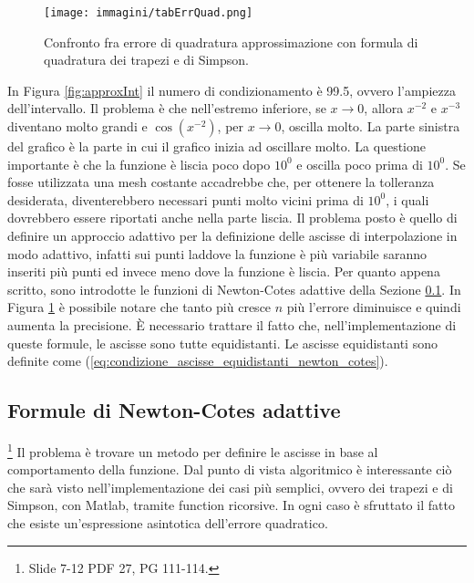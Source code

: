\begin{figure}
    \centering
    \texttt{[image: immagini/tabErrQuad.png]}
    \caption{Confronto fra errore di quadratura approssimazione con formula di quadratura dei trapezi e di Simpson.}\label{fig:tabella_errore_quadratura}
\end{figure}

In Figura \ref{fig:approxInt} il numero di condizionamento è 99.5, ovvero l'ampiezza dell'intervallo. Il problema è che nell'estremo inferiore, se $x\rightarrow 0$, allora $x^{-2}$ e $x^{-3}$ diventano molto grandi e $\cos{(x^{-2})}$, per $x\rightarrow 0$, oscilla molto. La parte sinistra del grafico è la parte in cui il grafico inizia ad oscillare molto. La questione importante è che la funzione è liscia poco dopo $10^0$ e oscilla poco prima di $10^0$. Se fosse utilizzata una mesh costante accadrebbe che, per ottenere la tolleranza desiderata, diventerebbero necessari punti molto vicini prima di $10^0$, i quali dovrebbero essere riportati anche nella parte liscia. Il problema posto è quello di definire un approccio adattivo per la definizione delle ascisse di interpolazione in modo adattivo, infatti sui punti laddove la funzione è più variabile saranno inseriti più punti ed invece meno dove la funzione è liscia. Per quanto appena scritto, sono introdotte le funzioni di Newton-Cotes adattive della Sezione \ref{ssec:formule_newton-cotes_adattive}.
In Figura \ref{fig:tabella_errore_quadratura} è possibile notare che tanto più cresce $n$ più l'errore diminuisce e quindi aumenta la precisione. È necessario trattare il fatto che, nell'implementazione di queste formule, le ascisse sono tutte equidistanti. Le ascisse equidistanti sono definite come (\ref{eq:condizione_ascisse_equidistanti_newton_cotes}).

\subsection{Formule di Newton-Cotes adattive}\label{ssec:formule_newton-cotes_adattive}
\footnote{Slide 7-12 PDF 27, PG 111-114.}
Il problema è trovare un metodo per definire le ascisse in base al comportamento della funzione. Dal punto di vista algoritmico è interessante ciò che sarà visto nell'implementazione dei casi più semplici, ovvero dei trapezi e di Simpson, con Matlab, tramite function ricorsive. In ogni caso è sfruttato il fatto che esiste un'espressione asintotica dell'errore quadratico.

